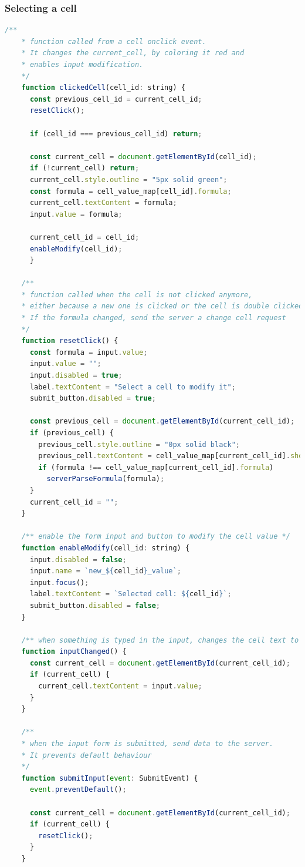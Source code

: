 \documentclass[12pt, a4paper]{article}
\begin{document}
  \subsubsection{Selecting a cell}
  \begin{lstlisting}[language=javascript, caption={To select a cell}]
    /**
    * function called from a cell onclick event.
    * It changes the current_cell, by coloring it red and
    * enables input modification.
    */
    function clickedCell(cell_id: string) {
      const previous_cell_id = current_cell_id;
      resetClick();
      
      if (cell_id === previous_cell_id) return;
      
      const current_cell = document.getElementById(cell_id);
      if (!current_cell) return;
      current_cell.style.outline = "5px solid green";
      const formula = cell_value_map[cell_id].formula;
      current_cell.textContent = formula;
      input.value = formula;
      
      current_cell_id = cell_id;
      enableModify(cell_id);
      }
      
    /**
    * function called when the cell is not clicked anymore,
    * either because a new one is clicked or the cell is double clicked.
    * If the formula changed, send the server a change cell request
    */
    function resetClick() {
      const formula = input.value;
      input.value = "";
      input.disabled = true;
      label.textContent = "Select a cell to modify it";
      submit_button.disabled = true;
    
      const previous_cell = document.getElementById(current_cell_id);
      if (previous_cell) {
        previous_cell.style.outline = "0px solid black";
        previous_cell.textContent = cell_value_map[current_cell_id].shown_value;
        if (formula !== cell_value_map[current_cell_id].formula)
          serverParseFormula(formula);
      }
      current_cell_id = "";
    }
    
    /** enable the form input and button to modify the cell value */
    function enableModify(cell_id: string) {
      input.disabled = false;
      input.name = `new_${cell_id}_value`;
      input.focus();
      label.textContent = `Selected cell: ${cell_id}`;
      submit_button.disabled = false;
    }
    
    /** when something is typed in the input, changes the cell text to keep up */
    function inputChanged() {
      const current_cell = document.getElementById(current_cell_id);
      if (current_cell) {
        current_cell.textContent = input.value;
      }
    }

    /**
    * when the input form is submitted, send data to the server.
    * It prevents default behaviour
    */
    function submitInput(event: SubmitEvent) {
      event.preventDefault();

      const current_cell = document.getElementById(current_cell_id);
      if (current_cell) {
        resetClick();
      }
    }
  \end{lstlisting}
\end{document}
